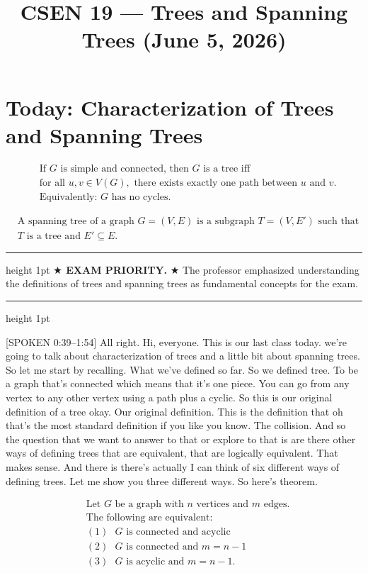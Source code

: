 \documentclass[11pt]{article}
\title{CSEN 19 — Trees and Spanning Trees (June 5, 2026)}
\date{}
\author{}
\theoremstyle{definition}
\newenvironment{exambox}
  {\par\medskip\noindent\begin{center}\begin{minipage}{0.92\textwidth}%
   \hrule height 1pt \vspace{4pt}\noindent\textbf{$\bigstar$ EXAM PRIORITY.} }
  {\vspace{4pt}\hrule height 1pt \end{minipage}\end{center}\medskip}
\begin{document}
\maketitle

\section*{Today: Characterization of Trees and Spanning Trees}

\hrulefill

\begin{align*}
& \text{If } G \text{ is simple and connected, then } G \text{ is a tree iff } \\
& \text{for all } u,v \in V(G), \text{ there exists exactly one path between } u \text{ and } v. \\
& \text{Equivalently: } G \text{ has no cycles.}
\end{align*}

\begin{align*}
& \text{A spanning tree of a graph } G = (V,E) \text{ is a subgraph } T = (V, E') \text{ such that} \\
& T \text{ is a tree and } E' \subseteq E.
\end{align*}

\begin{exambox}
★ The professor emphasized understanding the definitions of trees and spanning trees as fundamental concepts for the exam.
\end{exambox}

[SPOKEN 0:39–1:54]
All right. Hi, everyone. This is our last class today. we're going to talk about characterization of trees and a little bit about spanning trees. So let me start by recalling. What we've defined so far. So we defined tree. To be a graph that's connected which means that it's one piece. You can go from any vertex to any other vertex using a path plus a cyclic. So this is our original definition of a tree okay. Our original definition. This is the definition that oh that's the most standard definition if you like you know. The collision. And so the question that we want to answer to that or explore to that is are there other ways of defining trees that are equivalent, that are logically equivalent. That makes sense. And there is there's actually I can think of six different ways of defining trees. Let me show you three different ways. So here's theorem.

\begin{align*}
& \text{Let } G \text{ be a graph with } n \text{ vertices and } m \text{ edges.} \\
& \text{The following are equivalent:} \\
& (1) \text{ } G \text{ is connected and acyclic} \\
& (2) \text{ } G \text{ is connected and } m=n-1 \\
& (3) \text{ } G \text{ is acyclic and } m=n-1.
\end{align*}
\end{document}
